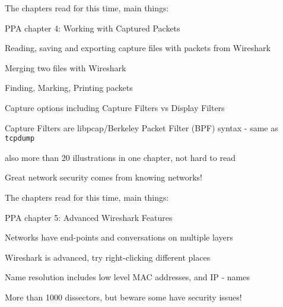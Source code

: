 \documentclass[Screen16to9,17pt]{foils}
\begin{document}
\begin{list1}
\item The chapters read for this time, main things:
\item PPA chapter 4: Working with Captured Packets
\begin{list2}
\item Reading, saving and exporting capture files with packets from Wireshark
\item Merging two files with Wireshark
\item Finding, Marking, Printing packets
\item Capture options including Capture Filters vs Display Filters
\item Capture Filters are libpcap/Berkeley Packet
Filter (BPF) syntax - same as \verb+tcpdump+
\end{list2}
\item also more than 20 illustrations in one chapter, not hard to read
\end{list1}

\vskip 5mm
\centerline{\Large Great network security comes from knowing networks!}


\begin{list1}
\item The chapters read for this time, main things:
\item PPA chapter 5: Advanced Wireshark Features
\begin{list2}
\item Networks have end-points and conversations on multiple layers
\item Wireshark is advanced, try right-clicking different places
\item Name resolution includes low level MAC addresses, and IP - names
\item More than 1000 dissectors, but beware some have security issues!
\end{list2}
\end{list1}

\end{document}
